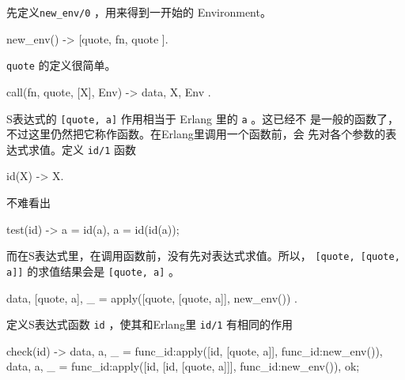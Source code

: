 \documentclass[preview,multi,crop=false,border=1in,class=memoir]{standalone}
\begin{document}
\begin{preview-page}
先定义\verb|new_env/0| ，用来得到一开始的 Environment。

\begin{SourceCode}
new_env() ->
    [{quote, {fn, quote}}
].
\end{SourceCode}

\verb|quote| 的定义很简单。

\begin{SourceCode}
call({fn, quote}, [X], Env) ->
    {{data, X}, Env}
.
\end{SourceCode}

S表达式的 \verb|[quote, a]| 作用相当于 Erlang 里的 \verb|a| 。这已经不
是一般的函数了，不过这里仍然把它称作函数。在Erlang里调用一个函数前，会
先对各个参数的表达式求值。定义 \verb|id/1| 函数

\begin{SourceCode}
id(X) ->
    X.
\end{SourceCode}

不难看出

\begin{SourceCode}
test(id) ->
    a = id(a),
    a = id(id(a));
\end{SourceCode}

而在S表达式里，在调用函数前，没有先对表达式求值。所以，
\verb|[quote, [quote, a]]| 的求值结果会是 \verb|[quote, a]| 。

\begin{SourceCode}
    {{data, [quote, a]}, _} =
        apply([quote, [quote, a]], new_env())
.
\end{SourceCode}


\begin{Exercise}[title={id},difficulty=1]
定义S表达式函数 \verb|id| ，使其和Erlang里 \verb|id/1| 有相同的作用

\begin{SourceCode}
check(id) ->
    {{data, a}, _} =
        func_id:apply([id, [quote, a]], func_id:new_env()),
    {{data, a}, _} =
        func_id:apply([id, [id, [quote, a]]], func_id:new_env()),
    ok;
\end{SourceCode}


\end{Exercise}
\end{preview-page}
\end{document}
